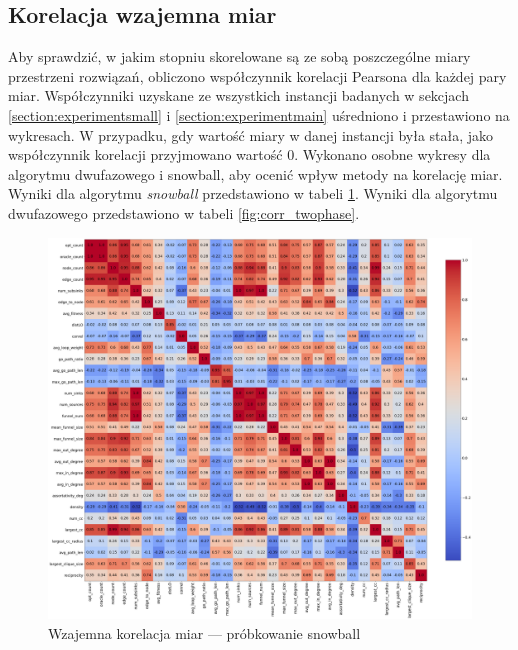 \subsection{Korelacja wzajemna miar} \label{section:experimentcorr}
Aby sprawdzić, w jakim stopniu skorelowane są ze sobą poszczególne miary przestrzeni rozwiązań, obliczono współczynnik korelacji Pearsona dla każdej pary miar.
Współczynniki uzyskane ze wszystkich instancji badanych w sekcjach \ref{section:experimentsmall} i \ref{section:experimentmain} uśredniono i przestawiono na wykresach.
W przypadku, gdy wartość miary w danej instancji była stała, jako współczynnik korelacji przyjmowano wartość 0.
Wykonano osobne wykresy dla algorytmu dwufazowego i snowball, aby ocenić wpływ metody na korelację miar.
Wyniki dla algorytmu \textit{snowball} przedstawiono w tabeli \ref{fig:corr_snowball}.
Wyniki dla algorytmu dwufazowego przedstawiono w tabeli \ref{fig:corr_twophase}.
\begin{figure}[h!]
    \centering
    \includegraphics[width=\textwidth]{chapters/experiments/img/snowball_corr.png}
    \caption{Wzajemna korelacja miar --- próbkowanie snowball}
    \label{fig:corr_snowball}
\end{figure}

